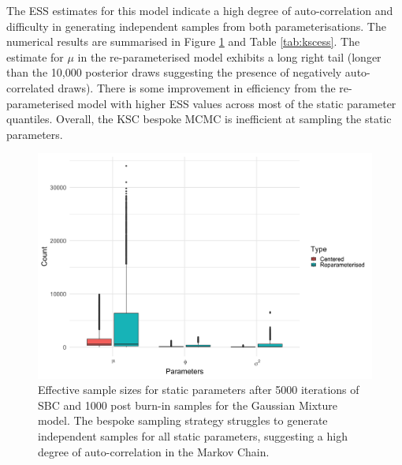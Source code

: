 \documentclass[12pt, a4paper]{article}
\begin{document}
    The ESS estimates for this model indicate a high degree of auto-correlation and difficulty in generating independent samples from both parameterisations. The numerical results are summarised in Figure \ref{fig:kscess} and Table \ref{tab:kscess}. The estimate for $\mu$ in the re-parameterised model exhibits a long right tail (longer than the 10,000 posterior draws suggesting the presence of negatively auto-correlated draws). There is some improvement in efficiency from the re-parameterised model with higher ESS values across most of the static parameter quantiles. Overall, the KSC bespoke MCMC is inefficient at sampling the static parameters. 
    


    \begin{figure}[H]
        \centering
        \includegraphics[scale=0.1]{results/ksc_ess.png}
        \caption{Effective sample sizes for static parameters after 5000 iterations of SBC and 1000 post burn-in samples for the Gaussian Mixture model. The bespoke sampling strategy struggles to generate independent samples for all static parameters, suggesting a high degree of auto-correlation in the Markov Chain.}
        \label{fig:kscess}
    \end{figure}
\end{document}
